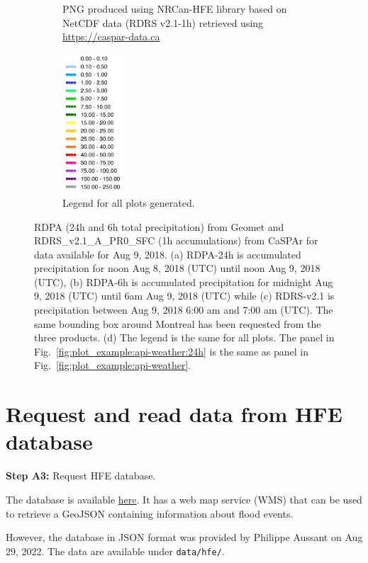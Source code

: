 \documentclass[10pt,a4paper,titlepage,parskip]{scrartcl}
\begin{document}
\begin{figure}[h!]
\begin{subfigure}[a]{0.5\textwidth}
		\caption{PNG produced using NRCan-HFE library based on NetCDF data (RDRS v2.1-1h) retrieved using \url{https://caspar-data.ca}}
		\label{fig:plot_example:caspar}
	\end{subfigure}
	\hspace*{0.02\textwidth}
	\begin{subfigure}[a]{0.5\textwidth}
		\centering
		\includegraphics[height=5.2cm]{figures/test-map-caspar-nrcan-hfe_legend.png}
		\caption{Legend for all plots generated.}
		\label{fig:plot_example:legend}
	\end{subfigure}
	\caption{RDPA (24h and 6h total precipitation) from Geomet and RDRS\_v2.1\_A\_PR0\_SFC (1h accumulations) from CaSPAr for data available for Aug 9, 2018. (a) RDPA-24h is accumulated precipitation for noon Aug 8, 2018 (UTC) until noon Aug 9, 2018 (UTC), (b) RDPA-6h is accumulated precipitation for midnight Aug 9, 2018 (UTC) until 6am Aug 9, 2018 (UTC) while (c) RDRS-v2.1 is precipitation between Aug 9, 2018 6:00 am and 7:00 am (UTC). The same bounding box around Montreal has been requested from the three products. (d) The legend is the same for all plots. The panel in Fig.~\ref{fig:plot_example:api-weather:24h} is the same as panel in Fig.~\ref{fig:plot_example:api-weather}. }
	\label{fig:plot_example_geomet-nrcan-hfe_vs_caspar-nrcan-hfe}
\end{figure}
\clearpage

\section{Request and read data from HFE database} 

\textbf{Step A3:} Request HFE database.

The database is available \href{https://open.canada.ca/data/en/dataset/fe83a604-aa5a-4e46-903c-685f8b0cc33c}{here}. It has a web map service (WMS) that can be used to retrieve a GeoJSON containing information about flood events.

However, the database in JSON format was provided by Philippe Aussant on Aug 29, 2022. The data are available under \texttt{data/hfe/}. 
\end{document}
